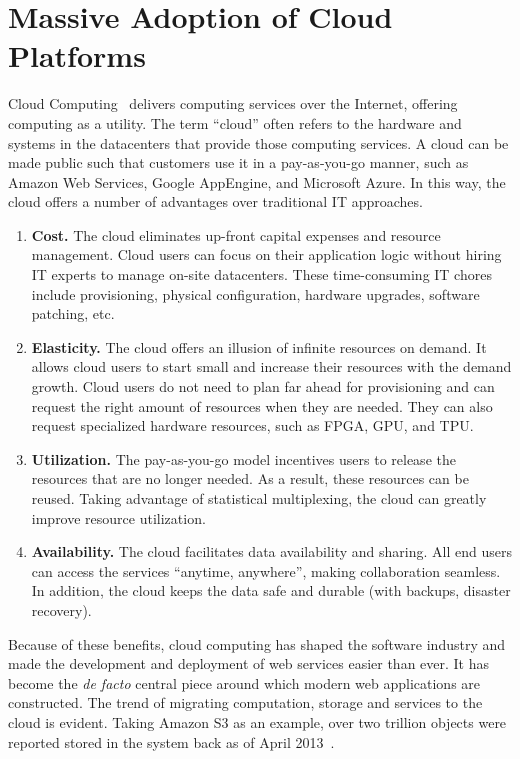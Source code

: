 \section{Massive Adoption of Cloud Platforms}
\label{sec:cloud}

Cloud Computing~\cite{armbrust2010view} delivers computing services over the
Internet, offering computing as a utility. The term ``cloud'' often refers to
the hardware and systems in the datacenters that provide those computing
services. A cloud can be made public such that customers use it in a
pay-as-you-go manner, such as Amazon Web Services, Google AppEngine, and
Microsoft Azure. In this way, the cloud offers a number of advantages over
traditional IT approaches.

\begin{enumerate}
\item \textbf{Cost.} The cloud eliminates up-front capital expenses and resource
  management. Cloud users can focus on their application logic without hiring IT
  experts to manage on-site datacenters. These time-consuming IT chores include
  provisioning, physical configuration, hardware upgrades, software patching,
  etc.

\item \textbf{Elasticity.} The cloud offers an illusion of infinite resources on
  demand. It allows cloud users to start small and increase their resources with
  the demand growth. Cloud users do not need to plan far ahead for provisioning
  and can request the right amount of resources when they are needed. They can
  also request specialized hardware resources, such as FPGA, GPU, and TPU.

\item \textbf{Utilization.} The pay-as-you-go model incentives users to release
  the resources that are no longer needed. As a result, these resources can be
  reused. Taking advantage of statistical multiplexing, the cloud can greatly
  improve resource utilization.

\item \textbf{Availability.} The cloud facilitates data availability and
  sharing. All end users can access the services ``anytime, anywhere'', making
  collaboration seamless. In addition, the cloud keeps the data safe and durable
  (with backups, disaster recovery).

\end{enumerate}

Because of these benefits, cloud computing has shaped the software industry and
made the development and deployment of web services easier than ever. It has
become the \textit{de facto} central piece around which modern web applications
are constructed. The trend of migrating computation, storage and services to the
cloud is evident. Taking Amazon S3 as an example, over two trillion objects were
reported stored in the system back as of April 2013~\cite{barr2013amazon}.


